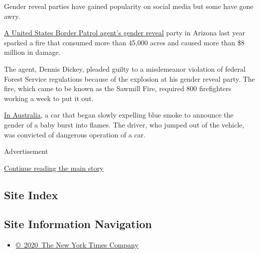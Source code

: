 Gender reveal parties have gained popularity on social media but some
have gone awry.

\href{https://www.nytimes3xbfgragh.onion/2018/10/01/us/gender-reveal-arizona-fire.html?module=inline}{A
United States Border Patrol agent's gender reveal} party in Arizona last
year sparked a fire that consumed more than 45,000 acres and caused more
than \$8 million in damage.

The agent, Dennis Dickey, pleaded guilty to a misdemeanor violation of
federal Forest Service regulations because of the explosion at his
gender reveal party. The fire, which came to be known as the Sawmill
Fire, required 800 firefighters working a week to put it out.

\href{https://www.cnn.com/videos/world/2019/07/09/australia-gold-coast-brisbane-gender-reveal-burnout-accident-lon-orig.cnn}{In
Australia}, a car that began slowly expelling blue smoke to announce the
gender of a baby burst into flames. The driver, who jumped out of the
vehicle, was convicted of dangerous operation of a car.

Advertisement

\protect\hyperlink{after-bottom}{Continue reading the main story}

\hypertarget{site-index}{%
\subsection{Site Index}\label{site-index}}

\hypertarget{site-information-navigation}{%
\subsection{Site Information
Navigation}\label{site-information-navigation}}

\begin{itemize}
\tightlist
\item
  \href{https://help.nytimes3xbfgragh.onion/hc/en-us/articles/115014792127-Copyright-notice}{©~2020~The
  New York Times Company}
\end{itemize}

